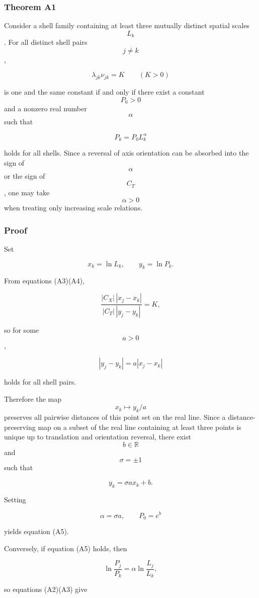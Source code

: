 \documentclass[
  a4paper,
]{article}
\begin{document}
\subsubsection{Theorem A1}\label{theorem-a1}

Consider a shell family containing at least three mutually distinct
spatial scales \[L_k\]. For all distinct shell pairs \[j\neq k\],

\[
\lambda_{jk}\nu_{jk}=K
\qquad
(K>0)
\tag{A4}
\]

is one and the same constant if and only if there exist a constant
\[P_0>0\] and a nonzero real number \[\alpha\] such that

\[
\boxed{
P_k=P_0L_k^{\alpha}
}
\tag{A5}
\]

holds for all shells. Since a reversal of axis orientation can be
absorbed into the sign of \[\alpha\] or the sign of \[C_T\], one may
take \[\alpha>0\] when treating only increasing scale relations.

\subsubsection{Proof}\label{proof}

Set

\[
x_k=\ln L_k,
\qquad
y_k=\ln P_k.
\]

From equations (A3)(A4),

\[
\frac{|C_X|\,|x_j-x_k|}
{|C_T|\,|y_j-y_k|}
=K,
\]

so for some \[a>0\],

\[
|y_j-y_k|
=
a|x_j-x_k|
\tag{A6}
\]

holds for all shell pairs.

Therefore the map \[x_k\mapsto y_k/a\] preserves all pairwise distances
of this point set on the real line. Since a distance-preserving map on a
subset of the real line containing at least three points is unique up to
translation and orientation reversal, there exist \[b\in\mathbb R\] and
\[\sigma=\pm1\] such that

\[
y_k
=
\sigma a x_k+b.
\tag{A7}
\]

Setting

\[
\alpha=\sigma a,
\qquad
P_0=e^b
\]

yields equation (A5).

Conversely, if equation (A5) holds, then

\[
\ln\frac{P_j}{P_k}
=
\alpha
\ln\frac{L_j}{L_k},
\]

so equations (A2)(A3) give
\end{document}
